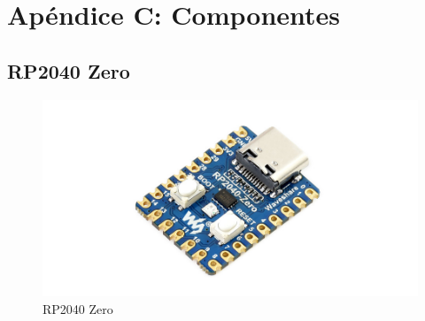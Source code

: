 \chapter{Apéndice C: Componentes}
\renewcommand{\thepage}{C-\arabic{page}}
\setcounter{page}{1}

    \section{RP2040 Zero}
    \label{rp2040}
            \begin{figure}[!ht]
                \centering
                \includegraphics[width=0.7\linewidth]{Imagenes/Anexo_C/RP2040 Zero.png}
                \caption{RP2040 Zero}
                \label{fig:c1}
            \end{figure}
            
